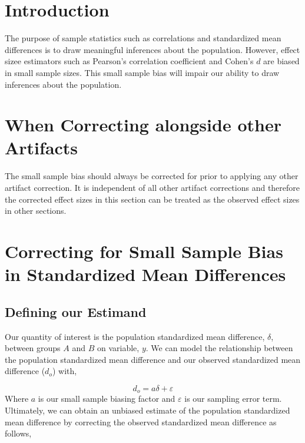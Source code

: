 \documentclass[
  letterpaper,
  DIV=11,
  numbers=noendperiod]{scrreprt}
\begin{document}
\hypertarget{introduction}{%
\section{Introduction}\label{introduction}}

The purpose of sample statistics such as correlations and standardized
mean differences is to draw meaningful inferences about the population.
However, effect sizee estimators such as Pearson's correlation
coefficient and Cohen's \(d\) are biased in small sample sizes. This
small sample bias will impair our ability to draw inferences about the
population.

\hypertarget{when-correcting-alongside-other-artifacts}{%
\section{When Correcting alongside other
Artifacts}\label{when-correcting-alongside-other-artifacts}}

The small sample bias should always be corrected for prior to applying
any other artifact correction. It is independent of all other artifact
corrections and therefore the corrected effect sizes in this section can
be treated as the observed effect sizes in other sections.

\hypertarget{correcting-for-small-sample-bias-in-standardized-mean-differences}{%
\section{Correcting for Small Sample Bias in Standardized Mean
Differences}\label{correcting-for-small-sample-bias-in-standardized-mean-differences}}

\hypertarget{defining-our-estimand}{%
\subsection{Defining our Estimand}\label{defining-our-estimand}}

Our quantity of interest is the population standardized mean difference,
\(\delta\), between groups \(A\) and \(B\) on variable, \(y\). We can
model the relationship between the population standardized mean
difference and our observed standardized mean difference (\(d_o\)) with,

\[
d_o = a\delta+\varepsilon
\] Where \(a\) is our small sample biasing factor and \(\varepsilon\) is
our sampling error term. Ultimately, we can obtain an unbiased estimate
of the population standardized mean difference by correcting the
observed standardized mean difference as follows,
\end{document}
